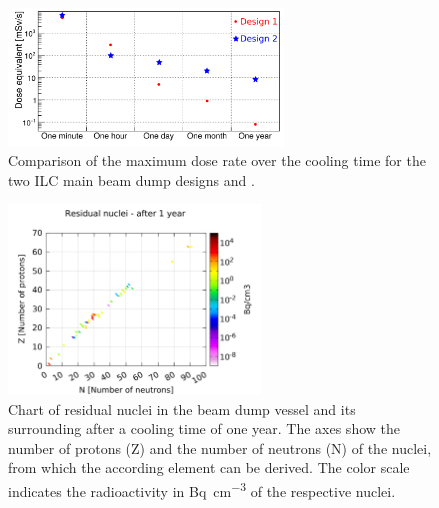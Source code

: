 \begin{figure}[hbp]
\centering
\includegraphics[width=0.65\textwidth]{Figures/BeamDump/DoseEQ_Time_Comparison.png}
\caption[Dose rate comparison of the ILC main beam dump designs]{Comparison of the maximum dose rate over the cooling time for the two ILC main beam dump designs \designone and \designtwo.}
\label{fig:BeamDumps:DoseRate_Comparison}
\end{figure}

\begin{figure}[!hbp]
\centering
\includegraphics[width=0.6\textwidth]{Figures/BeamDump/Corrected_residualnuclei_plots/ResidualNuclei_Design2_5_correct_scale.pdf}
\caption[Residual nuclei in the ILC main beam dump after one year]{Chart of residual nuclei in the beam dump vessel and its surrounding after a cooling time of one year.
The axes show the number of protons (Z) and the number of neutrons (N) of the nuclei, from which the according element can be derived.
The color scale indicates the radioactivity in \si{\becquerel\per\centi\meter\cubed} of the respective nuclei.}
\label{fig:BeamDumps:ResidualNuclei}
\end{figure}
 
